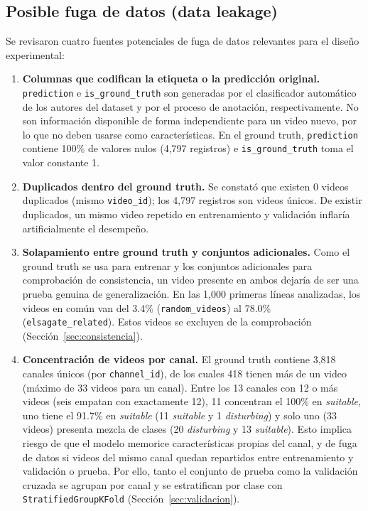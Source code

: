 \documentclass[conference]{IEEEtran}
\begin{document}
\subsection{Posible fuga de datos (data leakage)}\label{sec:leak}
Se revisaron cuatro fuentes potenciales de fuga de datos relevantes para el diseño experimental:
\begin{enumerate}
\item \textbf{Columnas que codifican la etiqueta o la predicción original.} \texttt{prediction} e \texttt{is\_ground\_truth} son generadas por el clasificador automático de los autores del dataset y por el proceso de anotación, respectivamente. No son información disponible de forma independiente para un video nuevo, por lo que no deben usarse como características. En el ground truth, \texttt{prediction} contiene 100\% de valores nulos (4,797 registros) e \texttt{is\_ground\_truth} toma el valor constante 1.
\item \textbf{Duplicados dentro del ground truth.} Se constató que existen 0 videos duplicados (mismo \texttt{video\_id}); los 4,797 registros son videos únicos. De existir duplicados, un mismo video repetido en entrenamiento y validación inflaría artificialmente el desempeño.
\item \textbf{Solapamiento entre ground truth y conjuntos adicionales.} Como el ground truth se usa para entrenar y los conjuntos adicionales para comprobación de consistencia, un video presente en ambos dejaría de ser una prueba genuina de generalización. En las 1,000 primeras líneas analizadas, los videos en común van del 3.4\% (\texttt{random\_videos}) al 78.0\% (\texttt{elsagate\_related}). Estos videos se excluyen de la comprobación (Sección~\ref{sec:consistencia}).
\item \textbf{Concentración de videos por canal.} El ground truth contiene 3,818 canales únicos (por \texttt{channel\_id}), de los cuales 418 tienen más de un video (máximo de 33 videos para un canal). Entre los 13 canales con 12 o más videos (seis empatan con exactamente 12), 11 concentran el 100\% en \textit{suitable}, uno tiene el 91.7\% en \textit{suitable} (11 \textit{suitable} y 1 \textit{disturbing}) y solo uno (33 videos) presenta mezcla de clases (20 \textit{disturbing} y 13 \textit{suitable}). Esto implica riesgo de que el modelo memorice características propias del canal, y de fuga de datos si videos del mismo canal quedan repartidos entre entrenamiento y validación o prueba. Por ello, tanto el conjunto de prueba como la validación cruzada se agrupan por canal y se estratifican por clase con \texttt{StratifiedGroupKFold} (Sección~\ref{sec:validacion}).
\end{enumerate}
\end{document}
